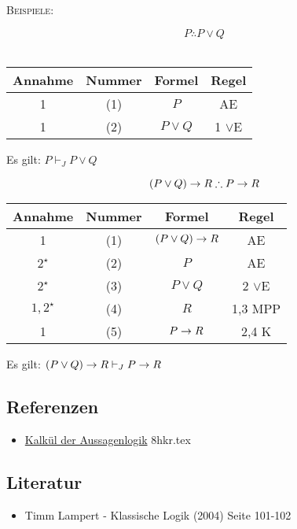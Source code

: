 \documentclass{sajzk}
\begin{document}
\textsc{Beispiele:}
\begin{center}
    \[P \therefore P \lor Q\] \\
\begin{tabular}{|c|c|c|c|}
  \hline
  Annahme            & Nummer & Formel       & Regel \\
  \hline
  1                  & (1)    & $P$          & AE \\
  \hline
  1                  & (2)    & $P \lor Q$   & 1 $\lor$E \\
  \hline
\end{tabular}
\end{center}
Es gilt: $P \vdash_J P \lor Q$
\newpage
\begin{center}
    \[(P \lor Q) \rightarrow R \therefore P \rightarrow  R\]
\begin{tabular}{|c|c|c|c|}
  \hline
  Annahme            & Nummer & Formel                 & Regel \\
  \hline
  1                  & (1)    & $(P \lor Q) \rightarrow R$     & AE \\
  \hline
  $2^\star$          & (2)    & $P$                    & AE \\
  \hline
  $2^\star$          & (3)    & $P \lor Q$             & 2 $\lor$E \\
  \hline
  $1, 2^\star$       & (4)    & $R$                    & 1,3 MPP \\
  \hline
  1                  & (5)    & $P \rightarrow R$              & 2,4 K \\
  \hline
\end{tabular}
\end{center}
Es gilt: $(P \lor Q) \rightarrow R \vdash_J P \rightarrow  R$
\subsection{Referenzen}
\begin{itemize}
    \item \href{8hkr.pdf}{Kalkül der Aussagenlogik} 8hkr.tex
\end{itemize}

\subsection{Literatur}
\begin{itemize}
    \item Timm Lampert - Klassische Logik (2004) Seite 101-102
\end{itemize}
\end{document}
